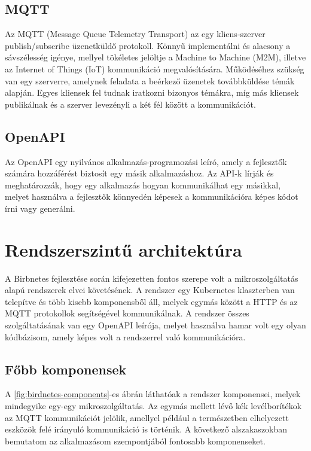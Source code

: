 \subsection{MQTT}
\label{subsect:mqtt}
Az MQTT (Message Queue Telemetry Transport) az egy kliens-szerver publish/subscribe üzenetküldő protokoll. Könnyű implementálni és alacsony a sávszélesség igénye,
mellyel tökéletes jelöltje a Machine to Machine (M2M), illetve az Internet of Things (IoT) kommunikáció megvalósítására.
Működéséhez szükség van egy szerverre, amelynek feladata a beérkező üzenetek továbbküldése témák alapján. Egyes kliensek fel tudnak iratkozni bizonyos témákra, míg más kliensek publikálnak
és a szerver levezényli a két fél között a kommunikációt.

\subsection{OpenAPI}
Az OpenAPI egy nyilvános alkalmazás-programozási leíró, amely a fejlesztők számára hozzáférést biztosít egy másik alkalmazáshoz.
Az API-k lírják és meghatározzák, hogy egy alkalmazás hogyan kommunikálhat egy másikkal, 
melyet használva a fejlesztők könnyedén képesek a kommunikációra képes kódot írni vagy generálni.

\section{Rendszerszintű architektúra}
A Birbnetes fejlesztése során kifejezetten fontos szerepe volt a mikroszolgáltatás alapú rendszerek elvei követésének.
A rendszer egy Kubernetes klaszterben van telepítve és több kisebb komponensből áll, melyek egymás között a HTTP és az MQTT protokollok segítségével kommunikálnak.
A rendszer összes szolgáltatásának van egy OpenAPI leírója, melyet használva hamar volt egy olyan kódbázisom, amely képes volt a rendszerrel való kommunikációra.


\subsection{Főbb komponensek}
A \ref{fig:birdnetes-components}-es ábrán láthatóak a rendszer komponensei, melyek mindegyike egy-egy mikroszolgáltatás.
Az egymás mellett lévő kék levélborítékok az MQTT kommunikációt jelölik,
amellyel például a természetben elhelyezett eszközök felé irányuló kommunikáció is történik.
A következő alszakaszokban bemutatom az alkalmazásom szempontjából fontosabb komponenseket.

